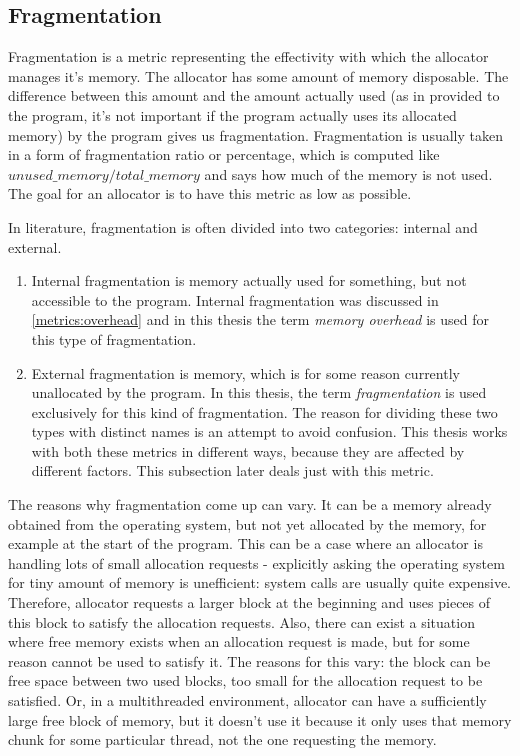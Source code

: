 \subsection{Fragmentation}
\label{metrics:fragmentation}

Fragmentation is a metric representing the effectivity with which the allocator manages it's memory. The allocator has some amount of memory disposable. The difference between this amount and the amount actually used (as in provided to the program, it's not important if the program actually uses its allocated memory) by the program gives us fragmentation. Fragmentation is usually taken in a form of fragmentation ratio or percentage, which is computed like $unused\_memory / total\_memory$ and says how much of the memory is not used. The goal for an allocator is to have this metric as low as possible.

In literature, fragmentation is often divided into two categories: internal and external.
\begin{enumerate}
\item Internal fragmentation is memory actually used for something, but not accessible to the program. Internal fragmentation was discussed in \ref{metrics:overhead} and in this thesis the term {\em memory overhead} is used for this type of fragmentation.
\item External fragmentation is memory, which is for some reason currently unallocated by the program. In this thesis, the term {\em fragmentation} is used exclusively for this kind of fragmentation. The reason for dividing these two types with distinct names is an attempt to avoid confusion. This thesis works with both these metrics in different ways, because they are affected by different factors. This subsection later deals just with this metric.
\end{enumerate}

The reasons why fragmentation come up can vary. It can be a memory already obtained from the operating system, but not yet allocated by the memory, for example at the start of the program. This can be a case where an allocator is handling lots of small allocation requests - explicitly asking the operating system for tiny amount of memory is unefficient: system calls are usually quite expensive. Therefore, allocator requests a larger block at the beginning and uses pieces of this block to satisfy the allocation requests. Also, there can exist a situation where free memory exists when an allocation request is made, but for some reason cannot be used to satisfy it. The reasons for this vary: the block can be free space between two used blocks, too small for the allocation request to be satisfied. Or, in a multithreaded environment, allocator can have a sufficiently large free block of memory, but it doesn't use it because it only uses that memory chunk for some particular thread, not the one requesting the memory.

